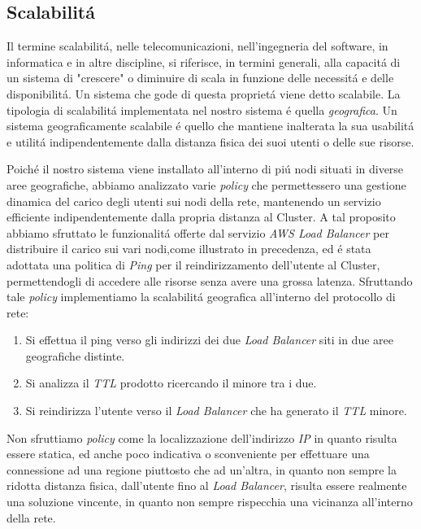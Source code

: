 \documentclass{sig-alternate-05-2015}
\begin{document}
\subsection{Scalabilit\'a}
Il termine scalabilit\'a, nelle telecomunicazioni, nell'ingegneria del software, in informatica e in altre discipline, si riferisce, in termini generali, alla capacit\'a di un sistema di "crescere" o diminuire di scala in funzione delle necessit\'a e delle disponibilit\'a. Un sistema che gode di questa propriet\'a viene detto scalabile.
La tipologia di scalabilit\'a implementata nel nostro sistema \'e quella \textit{geografica}.
Un sistema geograficamente scalabile \'e quello che mantiene inalterata la sua usabilit\'a e utilit\'a indipendentemente dalla distanza fisica dei suoi utenti o delle sue risorse.

Poich\'e il nostro sistema viene installato all'interno di pi\'u nodi situati in diverse aree geografiche, abbiamo analizzato varie \textit{policy} che permettessero una gestione dinamica del carico degli utenti sui nodi della rete, mantenendo un servizio efficiente indipendentemente dalla propria distanza al Cluster. A tal proposito abbiamo sfruttato
 le funzionalit\'a offerte dal servizio \textit{AWS Load Balancer} per distribuire il carico sui vari nodi,come illustrato in precedenza, ed \'e stata adottata una politica di \textit{Ping} per il reindirizzamento dell'utente al Cluster, permettendogli di accedere alle risorse senza avere una grossa latenza.
Sfruttando tale \textit{policy} implementiamo la scalabilit\'a geografica all'interno del protocollo di rete:
\begin{enumerate}
\item Si effettua il ping verso gli indirizzi dei due \textit{Load Balancer} siti in due aree geografiche distinte.
\item Si analizza il \textit{TTL} prodotto ricercando il minore tra i due.
\item Si reindirizza l'utente verso il \textit{Load Balancer} che ha generato il \textit{TTL} minore.
\end{enumerate}
 
Non sfruttiamo \textit{policy} come la localizzazione dell'indirizzo \textit{IP} in quanto risulta essere statica, ed anche poco indicativa o sconveniente per effettuare una connessione ad una regione piuttosto che ad un'altra,  in quanto non sempre la ridotta distanza fisica, dall'utente fino al \textit{Load Balancer}, risulta essere realmente una soluzione vincente, in quanto non sempre rispecchia una vicinanza all'interno della rete.
\end{document}
